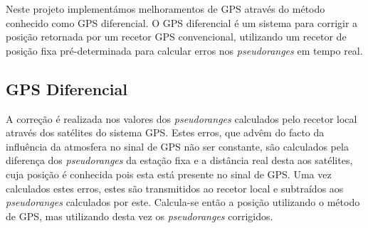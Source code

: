 \documentclass{article}
\begin{document}
Neste projeto implementámos melhoramentos de GPS através do método
conhecido como GPS diferencial. O GPS diferencial é um sistema para
corrigir a posição retornada por um recetor GPS convencional, utilizando um recetor de posição fixa pré-determinada para
calcular erros nos \textit{pseudoranges} em tempo real.

\subsection{GPS Diferencial}\label{diferential_theory}

A correção é realizada nos valores dos \textit{pseudoranges}
calculados pelo recetor local através dos satélites do sistema GPS.
Estes erros, que advêm do facto da influência da atmosfera no sinal
de GPS não ser constante, são calculados pela diferença dos
\textit{pseudoranges} da estação fixa e a distância real desta aos
satélites, cuja posição é conhecida pois esta está presente no sinal
de GPS. Uma vez calculados estes erros, estes são transmitidos ao
recetor local e subtraídos aos \textit{pseudoranges} calculados por
este. Calcula-se então a posição utilizando o método de GPS, mas
utilizando desta vez os \textit{pseudoranges} corrigidos.
\end{document}
